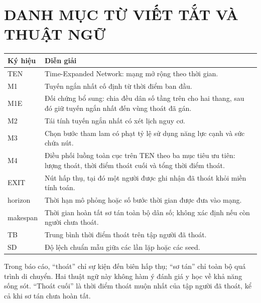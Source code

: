\clearpage\section*{DANH MỤC TỪ VIẾT TẮT VÀ THUẬT NGỮ}
\begin{tabularx}{\linewidth}{P{2.6cm}X}\toprule
Ký hiệu & Diễn giải\\\midrule
TEN & Time-Expanded Network: mạng mở rộng theo thời gian.\\
M1 & Tuyến ngắn nhất cố định từ thời điểm ban đầu.\\
M1E & Đối chứng bổ sung: chia đều dân số tầng trên cho hai thang, sau đó giữ tuyến ngắn nhất đến vùng thoát đã gán.\\
M2 & Tái tính tuyến ngắn nhất có xét lịch nguy cơ.\\
M3 & Chọn bước tham lam có phạt tỷ lệ sử dụng năng lực cạnh và sức chứa nút.\\
M4 & Điều phối luồng toàn cục trên TEN theo ba mục tiêu ưu tiên: lượng thoát, thời điểm thoát cuối và tổng thời điểm thoát.\\
EXIT & Nút hấp thụ, tại đó một người được ghi nhận đã thoát khỏi miền tính toán.\\
horizon & Thời hạn mô phỏng hoặc số bước thời gian được đưa vào mạng.\\
makespan & Thời gian hoàn tất sơ tán toàn bộ dân số; không xác định nếu còn người chưa thoát.\\
TB & Trung bình thời điểm thoát trên tập người đã thoát.\\
SD & Độ lệch chuẩn mẫu giữa các lần lặp hoặc các seed.\\
\bottomrule\end{tabularx}

Trong báo cáo, ``thoát'' chỉ sự kiện đến biên hấp thụ; ``sơ tán'' chỉ toàn bộ quá trình di chuyển. Hai thuật ngữ này không hàm ý đánh giá y học về khả năng sống sót. ``Thoát cuối'' là thời điểm thoát muộn nhất của tập người đã thoát, kể cả khi sơ tán chưa hoàn tất.
